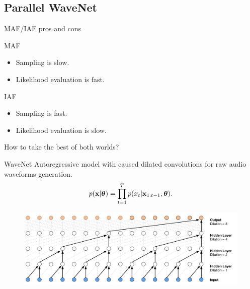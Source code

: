 \subsection{Parallel WaveNet}
\begin{frame}{MAF/IAF pros and cons}
	\begin{minipage}{0.50\columnwidth}
		\begin{block}{MAF}
			\begin{itemize}
				\item Sampling is slow.
				\item Likelihood evaluation is fast.
			\end{itemize}
		\end{block}
	\end{minipage}%
	\begin{minipage}{0.51\columnwidth}
		\begin{block}{IAF}
			\begin{itemize}
				\item Sampling is fast.
				\item Likelihood evaluation is slow.
			\end{itemize}
		\end{block}
	\end{minipage}
	How to take the best of both worlds?
	\begin{block}{WaveNet}
		Autoregressive model with caused dilated convolutions for raw audio waveforms generation.
		\vspace{-0.5cm}
		\[
			p(\mathbf{x}| \boldsymbol{\theta}) = \prod_{t=1}^T p(x_t|\mathbf{x}_{1:t-1}, \boldsymbol{\theta}).
		\]
		\vspace{-0.7cm}
		\begin{figure}
			\centering
			\includegraphics[width=0.85\linewidth]{figs/wavenet2.png}
		\end{figure}
	\end{block}
\end{frame}
